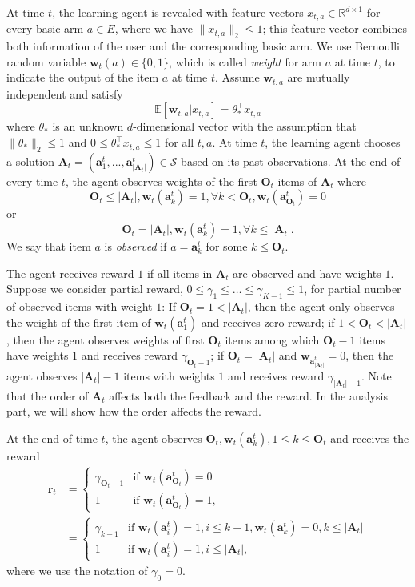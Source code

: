 \documentclass{article}
\newcommand{\EE}{\mathbb{E}}
\newcommand{\RR}{\mathbb{R}}
\newcommand{\bA}{\mathbf{A}}
\newcommand{\ba}{\mathbf{a}}
\newcommand{\bO}{\mathbf{O}}
\newcommand{\br}{\mathbf{r}}
\newcommand{\bw}{\mathbf{w}}
\newcommand{\cS}{\mathcal{S}}
\newcommand{\abs}[1]{\left| #1 \right|}
\newcommand{\norm}[1]{\| #1 \|}
\begin{document}
At time $t$, the learning agent is revealed with feature vectors $x_{t,a} \in \RR^{d \times 1}$ for every basic arm $a \in E$, where we have $\norm{x_{t,a}}_2 \leq 1$; this feature vector combines both information of the user and the corresponding basic arm. We use Bernoulli random variable $\bw_{t}(a) \in \{0,1\}$, which is called {\it weight} for arm $a$ at time $t$, to indicate the output of the item $a$ at time $t$. Assume $\bw_{t,a}$ are mutually independent and satisfy
\begin{equation}
\label{eq:expectation}
\EE[\bw_{t,a} | x_{t,a}] = \theta_*^{\top} x_{t,a}
\end{equation}
where $\theta_*$ is an unknown $d$-dimensional vector with the assumption that $\norm{\theta_*}_2 \leq 1$ and $0 \leq \theta_*^{\top} x_{t,a} \leq 1$ for all $t, a$. At time $t$, the learning agent chooses a solution $\bA_t=(\ba_{1}^t,...,\ba_{\abs{\bA_t}}^t) \in \cS$ based on its past observations. At the end of every time $t$, the agent observes weights of the first $\bO_t$ items of $\bA_t$ where 
$$
\bO_t \leq \abs{\bA_t}, \bw_t(\ba_k^t) = 1, \forall k < \bO_t, \bw_t(\ba_{\bO_t}^t) = 0
$$ 
or 
$$
\bO_t = \abs{\bA_t}, \bw_t(\ba_k^t) = 1, \forall k \leq \abs{\bA_t}.
$$
We say that item $a$ is {\it observed} if $a = \ba_k^t$ for some $k \leq \bO_t$. 

The agent receives reward $1$ if all items in $\bA_t$ are observed and have weights $1$. Suppose we consider partial reward, $0 \leq \gamma_1 \leq \ldots \leq \gamma_{K-1} \leq 1$, for partial number of observed items with weight $1$: If $\bO_t = 1 < \abs{\bA_t}$, then the agent only observes the weight of the first item of $\bw_t(\ba_1^t)$ and receives zero reward; if $1 < \bO_t < \abs{\bA_t}$, then the agent observes weights of first $\bO_t$ items among which $\bO_t - 1$ items have weights 1 and receives reward $\gamma_{\bO_t - 1}$; if $\bO_t = \abs{\bA_t}$ and $\bw_{\ba_{\abs{\bA_t}}^t} = 0$, then the agent observes $\abs{\bA_t} - 1$ items with weights $1$ and receives reward $\gamma_{\abs{\bA_t} - 1}$. Note that the order of $\bA_t$ affects both the feedback and the reward. In the analysis part, we will show how the order affects the reward.

At the end of time $t$, the agent observes $\bO_t, \bw_t(\ba_k^t), 1\leq k\leq\bO_t$ and receives the reward
\begin{align*}
\br_t &= \begin{cases}
\gamma_{\bO_t - 1}  &\text{if } \bw_t(\ba_{\bO_t}^t) = 0\\
1 &\text{if } \bw_t(\ba_{\bO_t}^t) = 1,
\end{cases}\\
&=\begin{cases}
\gamma_{k - 1}  &\text{if } \bw_t(\ba_{i}^t) = 1, i\leq k-1, \bw_t(\ba_{k}^t) = 0, k\leq \abs{\bA_t}\\
1 &\text{if } \bw_t(\ba_{i}^t) = 1, i\leq \abs{\bA_t},
\end{cases}
\end{align*}
where we use the notation of $\gamma_0 = 0$.
	
\end{document}
